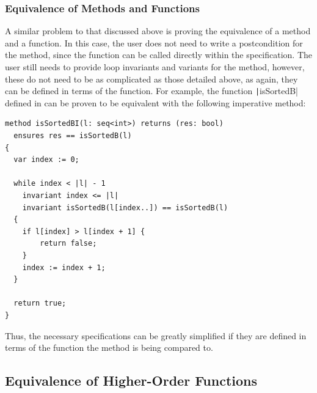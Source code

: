 \subsubsection{Equivalence of Methods and Functions}

A similar problem to that discussed above is proving the equivalence of a method and a function. In this case, the user does not need to write a postcondition for the method, since the function can be called directly within the specification. The user still needs to provide loop invariants and variants for the method, however, these do not need to be as complicated as those detailed above, as again, they can be defined in terms of the function. For example, the function \texttt|isSortedB| defined in  can be proven to be equivalent with the following imperative method:
\begin{verbatim}
method isSortedBI(l: seq<int>) returns (res: bool)
  ensures res == isSortedB(l)
{
  var index := 0;

  while index < |l| - 1
    invariant index <= |l|
    invariant isSortedB(l[index..]) == isSortedB(l)
  {
    if l[index] > l[index + 1] {
        return false;
    }
    index := index + 1;
  }

  return true;
}
\end{verbatim}
%
Thus, the necessary specifications can be greatly simplified if they are defined in terms of the function the method is being compared to.

\subsection{Equivalence of Higher-Order Functions}\label{sec:higher-order}

